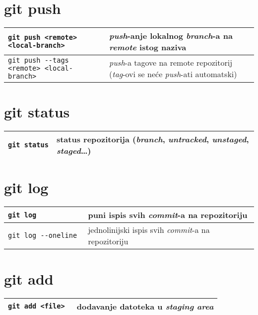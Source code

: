 \documentclass[10pt]{article}
\begin{document}
    \section*{git push}
    \begin{tabular}{|>{\tt}p{9.00cm}|>{}p{15.50cm}|}
        \hline
        git push <remote> <local-branch>                    & \textit{push}-anje lokalnog \textit{branch}-a na \textit{remote} istog naziva \\ \hline
        git push -{}-tags <remote> <local-branch>           & \textit{push}-a tagove na remote repozitorij (\textit{tag}-ovi se neće \textit{push}-ati automatski) \\ \hline                   
    \end{tabular}

    \section*{git status}
    \begin{tabular}{|>{\tt}p{9.00cm}|>{}p{15.50cm}|}
        \hline
        git status                                          & status repozitorija (\textit{branch}, \textit{untracked}, \textit{unstaged}, \textit{staged}\dots) \\ \hline
    \end{tabular}

    \section*{git log}
    \begin{tabular}{|>{\tt}p{9.00cm}|>{}p{15.50cm}|}
        \hline
        git log                                             & puni ispis svih \textit{commit}-a na repozitoriju \\ \hline 
        git log -{}-oneline                                 & jednolinijski ispis svih \textit{commit}-a na repozitoriju \\ \hline
    \end{tabular}

    \section*{git add}
    \begin{tabular}{|>{\tt}p{9.00cm}|>{}p{15.50cm}|}
        \hline
        git add <file>                                      & dodavanje datoteka u \textit{staging area} \\ \hline
    \end{tabular}
\end{document}
